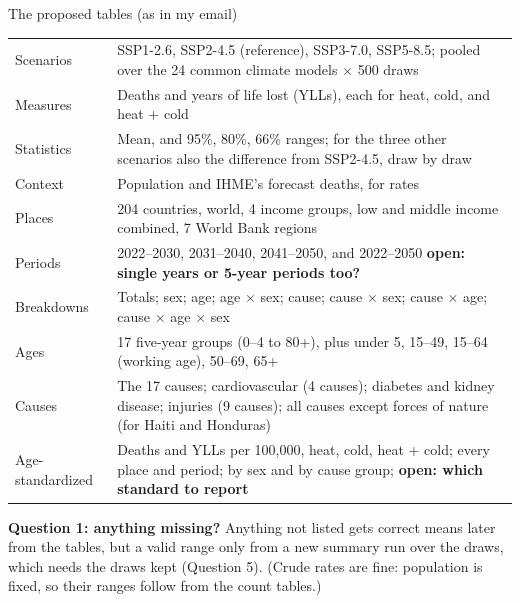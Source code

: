 \documentclass[aspectratio=169,11pt]{beamer}
\begin{document}
\begin{frame}{The proposed tables (as in my email)}
  \scriptsize
  \renewcommand{\arraystretch}{0.95}
  \begin{tabular}{L{0.16\textwidth}L{0.78\textwidth}}
    \toprule
    Scenarios & SSP1-2.6, SSP2-4.5 (reference), SSP3-7.0, SSP5-8.5; pooled over the 24 common climate models $\times$ 500 draws \\
    Measures & Deaths and years of life lost (YLLs), each for heat, cold, and heat + cold \\
    Statistics & Mean, and 95\%, 80\%, 66\% ranges; for the three other scenarios also the difference from SSP2-4.5, draw by draw \\
    Context & Population and IHME's forecast deaths, for rates \\
    Places & 204 countries, world, 4 income groups, low and middle income combined, 7 World Bank regions \\
    Periods & 2022--2030, 2031--2040, 2041--2050, and 2022--2050 \quad \textcolor{ozmagenta}{\textbf{open: single years or 5-year periods too?}} \\
    Breakdowns & Totals; sex; age; age $\times$ sex; cause; cause $\times$ sex; cause $\times$ age; cause $\times$ age $\times$ sex \\
    Ages & 17 five-year groups (0--4 to 80+), plus under 5, 15--49, 15--64 (working age), 50--69, 65+ \\
    Causes & The 17 causes; cardiovascular (4 causes); diabetes and kidney disease; injuries (9 causes); all causes except forces of nature (for Haiti and Honduras) \\
    Age-standardized & Deaths and YLLs per 100,000, heat, cold, heat + cold; every place and period; by sex and by cause group; \textcolor{ozmagenta}{\textbf{open: which standard to report}} \\
    \bottomrule
  \end{tabular}

  \medskip
  \raggedright
  \textbf{Question 1: anything missing?} Anything not listed gets correct means later from the tables, but a valid range only from a new summary run over the draws, which needs the draws kept (Question 5). (Crude rates are fine: population is fixed, so their ranges follow from the count tables.)
\end{frame}
\end{document}
